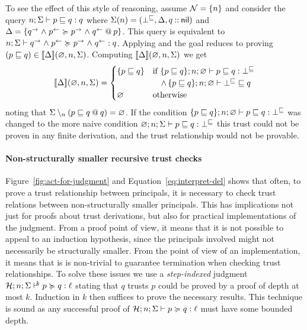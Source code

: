 To see the effect of this style of reasoning, assume $\Nameset = \{n\}$ and consider the query $\flowstoquery{n; \env}{p}{q}{q}$ where $\env(n) = (\bot^{\flowsto}, \scope, \cons{q}{\nil})$ and $\scope = \{\lb{p}{\conf{q} \conj \integ{p} \actsfor \conf{p} \conj \integ{q}}\}$. This query is equivalent to $\actsforquery{n; \env}{\conf{q} \conj \integ{p}}{\conf{p} \conj \integ{q}}{q}$. Applying  and  the goal reduces to proving $(p \flowsto q) \in \llbracket \scope \rrbracket(\varnothing, n, \env)$. Computing $\llbracket \scope \rrbracket(\varnothing, n, \env)$ we get
\begin{align*}
\llbracket \scope \rrbracket(\varnothing, n, \env) =
\begin{cases}
\{p \flowsto q \} &\text{if } \flowstoquery{\{p \flowsto q\}; n; \emptyenv}{p}{q}{\bot^{\flowsto}} \\
&\quad \wedge \, \nopostflowstoquery{\{p \flowsto q\}; n; \emptyenv}{\bot^{\flowsto}}{q} \\
\varnothing &\text{otherwise}
\end{cases}
\end{align*}
noting that $\env \setminus_{n} (\lb{q}{p \flowsto q}) = \emptyenv$. If the condition $\flowstoquery{\{p \flowsto q\}; n; \emptyenv}{p}{q}{\bot^{\flowsto}}$ was changed to the more naive condition $\flowstoquery{\varnothing; n; \env}{p}{q}{\bot^{\flowsto}}$ this trust could not be proven in any finite derivation, and the trust relationship would not be provable.

\paragraph{Non-structurally smaller recursive trust checks}
Figure~\ref{fig:act-for-judgment} and Equation~\eqref{eq:interpret-del} shows that often, to prove a trust relationship between principals, it is necessary to check trust relations between non-structurally smaller principals. This has implications not just for proofs about trust derivations, but also for practical implementations of the judgment. From a proof point of view, it means that it is not possible to appeal to an induction hypothesis, since the principals involved might not necessarily be structurally smaller. From the point of view of an implementation, it means that is is non-trivial to guarantee termination when checking trust relationships. To solve these issues we use a \emph{step-indexed} judgment $\actsforquerycount{\Assumps; n; \env}{p}{q}{\level}{k}$ stating that $q$ trusts $p$ could be proved by a proof of depth at most $k$. Induction in $k$ then suffices to prove the necessary results. This technique is sound as any successful proof of $\actsforquery{\Assumps; n; \env}{p}{q}{\level}$ must have some bounded depth.

